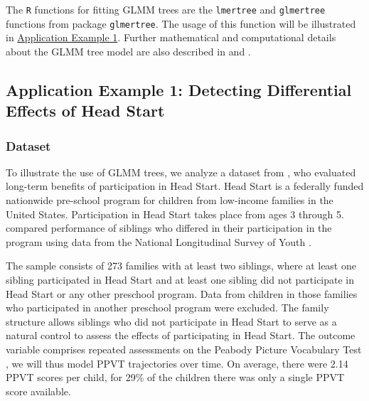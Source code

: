 \documentclass[doc,floatsintext,natbib]{apa7}
\begin{document}
The \texttt{R} functions for fitting GLMM trees are the \texttt{lmertree} and \texttt{glmertree} functions from package \texttt{glmertree}. The usage of this function will be illustrated in \hyperref[sec:TutorialMixed]{Application Example 1}. Further mathematical and computational details about the GLMM tree model are also described in \cite{FokkySmit18} and \cite{FokkyZeil24}. 






\subsection{Application Example 1: Detecting Differential Effects of Head Start}
\label{sec:TutorialMixed}



\subsubsection{Dataset}

To illustrate the use of GLMM trees, we analyze a dataset from \cite{Demi09}, who evaluated long-term benefits of participation in Head Start. Head Start is a federally funded nationwide pre-school program for children from low-income families in the United States. Participation in Head Start takes place from ages 3 through 5. \cite{Demi09} compared performance of siblings who differed in their participation in the program using data from the National Longitudinal Survey of Youth \citep{NLSY}. 

The sample consists of 273 families with at least two siblings, where at least one sibling participated in Head Start and at least one sibling did not participate in Head Start or any other preschool program. Data from children in those families who participated in another preschool program were excluded. The family structure allows siblings who did not participate in Head Start to serve as a natural control to assess the effects of participating in Head Start. The outcome variable comprises repeated assessments on the Peabody Picture Vocabulary Test \citep[PPVT]{DunnyDunn81}, we will thus model PPVT trajectories over time. On average, there were 2.14 PPVT scores per child, for 29\% of the children there was only a single PPVT score available. 

\end{document}

